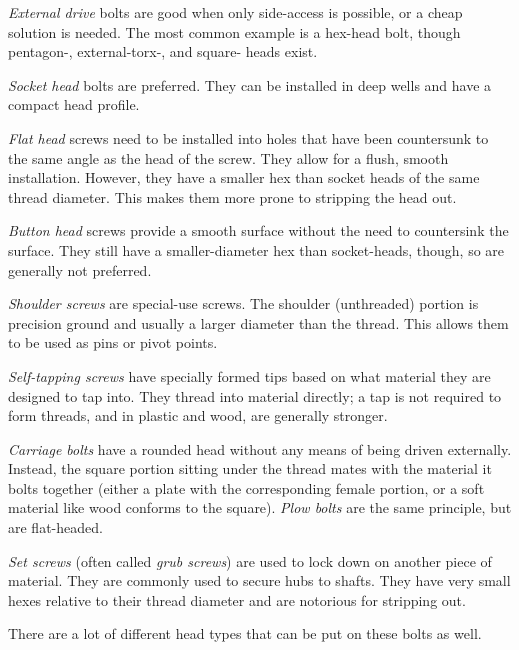 \documentclass[10pt,letterpaper]{book}
\begin{document}
	\begin{asparaenum}[a)]
		\item \textit{External drive} bolts are good when only side-access is possible, or a cheap solution is needed. The most common example is a hex-head bolt, though pentagon-, external-torx-, and square- heads exist.
		\item \textit{Socket head} bolts are preferred. They can be installed in deep wells and have a compact head profile.
		\item \textit{Flat head} screws need to be installed into holes that have been countersunk to the same angle as the head of the screw. They allow for a flush, smooth installation. However, they have a smaller hex than socket heads of the same thread diameter. This makes them more prone to stripping the head out.
		\item \textit{Button head} screws provide a smooth surface without the need to countersink the surface. They still have a smaller-diameter hex than socket-heads, though, so are generally not preferred.
		\item \textit{Shoulder screws} are special-use screws. The shoulder (unthreaded) portion is precision ground and usually a larger diameter than the thread. This allows them to be used as pins or pivot points.
		\item \textit{Self-tapping screws} have specially formed tips based on what material they are designed to tap into. They thread into material directly; a tap is not required to form threads, and in plastic and wood, are generally stronger.
		\item \textit{Carriage bolts} have a rounded head without any means of being driven externally. Instead, the square portion sitting under the thread mates with the material it bolts together (either a plate with the corresponding female portion, or a soft material like wood conforms to the square). \textit{Plow bolts} are the same principle, but are flat-headed.
		\item \textit{Set screws} (often called \textit{grub screws}) are used to lock down on another piece of material. They are commonly used to secure hubs to shafts. They have very small hexes relative to their thread diameter and are notorious for stripping out.
	\end{asparaenum}
	
	There are a lot of different head types that can be put on these bolts as well. 
	
\end{document}
